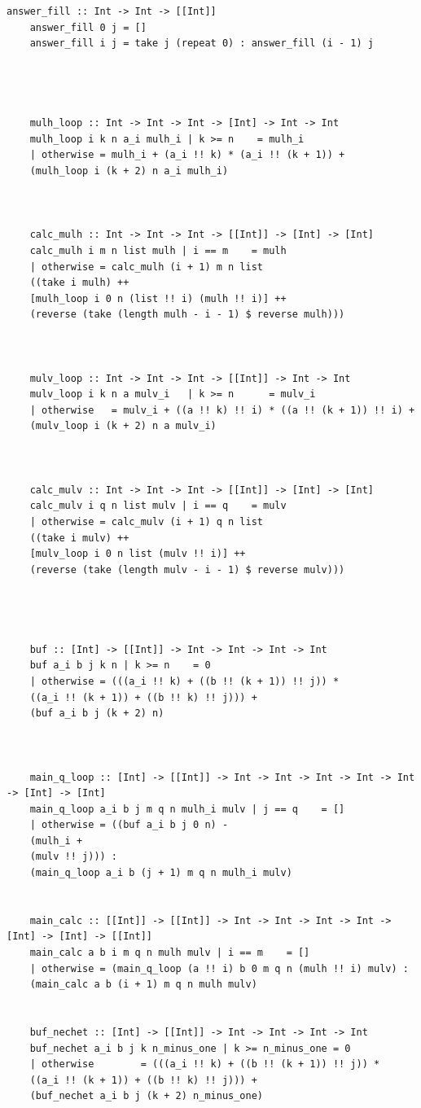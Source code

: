 \documentclass[12pt]{report}
\begin{document}
	\begin{lstlisting}[label=some-code3,caption=Оптимизированный алгоритм Виноградова]
	answer_fill :: Int -> Int -> [[Int]]
	answer_fill 0 j = []
	answer_fill i j = take j (repeat 0) : answer_fill (i - 1) j
	
	
	
	
	mulh_loop :: Int -> Int -> Int -> [Int] -> Int -> Int
	mulh_loop i k n a_i mulh_i | k >= n    = mulh_i
	| otherwise = mulh_i + (a_i !! k) * (a_i !! (k + 1)) + 
	(mulh_loop i (k + 2) n a_i mulh_i)
	
	
	
	calc_mulh :: Int -> Int -> Int -> [[Int]] -> [Int] -> [Int]
	calc_mulh i m n list mulh | i == m    = mulh
	| otherwise = calc_mulh (i + 1) m n list 
	((take i mulh) ++
	[mulh_loop i 0 n (list !! i) (mulh !! i)] ++
	(reverse (take (length mulh - i - 1) $ reverse mulh)))
	
	
	
	mulv_loop :: Int -> Int -> Int -> [[Int]] -> Int -> Int
	mulv_loop i k n a mulv_i   | k >= n      = mulv_i
	| otherwise   = mulv_i + ((a !! k) !! i) * ((a !! (k + 1)) !! i) + 
	(mulv_loop i (k + 2) n a mulv_i)
	
	
	
	calc_mulv :: Int -> Int -> Int -> [[Int]] -> [Int] -> [Int]
	calc_mulv i q n list mulv | i == q    = mulv
	| otherwise = calc_mulv (i + 1) q n list 
	((take i mulv) ++
	[mulv_loop i 0 n list (mulv !! i)] ++
	(reverse (take (length mulv - i - 1) $ reverse mulv)))
	
	
	
	
	buf :: [Int] -> [[Int]] -> Int -> Int -> Int -> Int
	buf a_i b j k n | k >= n    = 0
	| otherwise = (((a_i !! k) + ((b !! (k + 1)) !! j)) * 
	((a_i !! (k + 1)) + ((b !! k) !! j))) + 
	(buf a_i b j (k + 2) n)
	
	
	
	main_q_loop :: [Int] -> [[Int]] -> Int -> Int -> Int -> Int -> Int -> [Int] -> [Int]
	main_q_loop a_i b j m q n mulh_i mulv | j == q    = []
	| otherwise = ((buf a_i b j 0 n) - 
	(mulh_i + 
	(mulv !! j))) : 
	(main_q_loop a_i b (j + 1) m q n mulh_i mulv)
	
	
	main_calc :: [[Int]] -> [[Int]] -> Int -> Int -> Int -> Int -> [Int] -> [Int] -> [[Int]]
	main_calc a b i m q n mulh mulv | i == m    = []
	| otherwise = (main_q_loop (a !! i) b 0 m q n (mulh !! i) mulv) : 
	(main_calc a b (i + 1) m q n mulh mulv)
	
	
	buf_nechet :: [Int] -> [[Int]] -> Int -> Int -> Int -> Int
	buf_nechet a_i b j k n_minus_one | k >= n_minus_one = 0
	| otherwise        = (((a_i !! k) + ((b !! (k + 1)) !! j)) * 
	((a_i !! (k + 1)) + ((b !! k) !! j))) + 
	(buf_nechet a_i b j (k + 2) n_minus_one)
	

\end{lstlisting}
\end{document}
